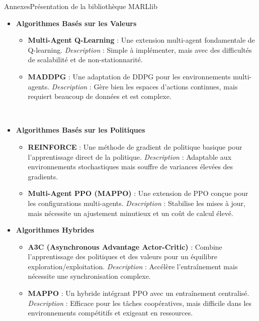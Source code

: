 \begin{frame}[allowframebreaks]{Annexes}{Présentation de la bibliothèque MARLlib}

    \begin{itemize}
        \item \textbf{Algorithmes Basés sur les Valeurs}  
        \begin{itemize}
            \item \textbf{Multi-Agent Q-Learning} : Une extension multi-agent fondamentale de Q-learning.  
            \textit{Description} : Simple à implémenter, mais avec des difficultés de scalabilité et de non-stationnarité.
            \item \textbf{MADDPG} : Une adaptation de DDPG pour les environnements multi-agents.  
            \textit{Description} : Gère bien les espaces d'actions continues, mais requiert beaucoup de données et est complexe.
        \end{itemize}
    
        \

        \item \textbf{Algorithmes Basés sur les Politiques}  
        \begin{itemize}
            \item \textbf{REINFORCE} : Une méthode de gradient de politique basique pour l'apprentissage direct de la politique.  
            \textit{Description} : Adaptable aux environnements stochastiques mais souffre de variances élevées des gradients.
            \item \textbf{Multi-Agent PPO (MAPPO)} : Une extension de PPO conçue pour les configurations multi-agents.  
            \textit{Description} : Stabilise les mises à jour, mais nécessite un ajustement minutieux et un coût de calcul élevé.
        \end{itemize}
    
        \item \textbf{Algorithmes Hybrides}  
        \begin{itemize}
            \item \textbf{A3C (Asynchronous Advantage Actor-Critic)} : Combine l'apprentissage des politiques et des valeurs pour un équilibre exploration/exploitation.  
            \textit{Description} : Accélère l'entraînement mais nécessite une synchronisation complexe.
            \item \textbf{MAPPO} : Un hybride intégrant PPO avec un entraînement centralisé.  
            \textit{Description} : Efficace pour les tâches coopératives, mais difficile dans les environnements compétitifs et exigeant en ressources.
        \end{itemize}
    

\end{itemize}
\end{frame}
